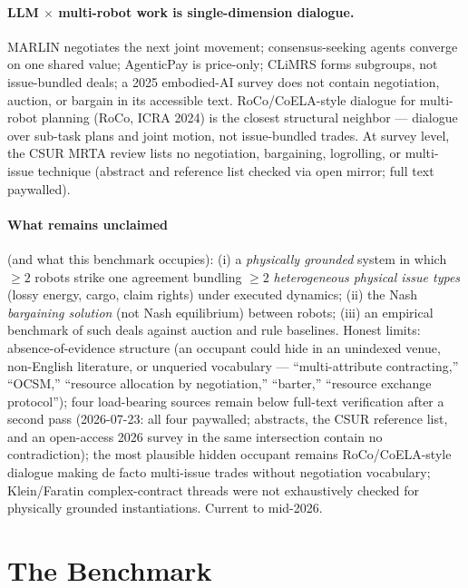 \documentclass[sigconf,nonacm]{acmart}
\begin{document}
\paragraph{LLM $\times$ multi-robot work is single-dimension dialogue.}
MARLIN \cite{godfrey2024marlin} negotiates the next joint movement;
consensus-seeking agents \cite{chen2023consensus} converge on one shared
value; AgenticPay \cite{liu2026agenticpay} is price-only; CLiMRS
\cite{song2026climrs} forms subgroups, not issue-bundled deals; a 2025
embodied-AI survey \cite{feng2025embodied} does not contain negotiation,
auction, or bargain in its accessible text. RoCo/CoELA-style dialogue for
multi-robot planning (RoCo, ICRA 2024) is the closest structural neighbor
--- dialogue over sub-task plans and joint motion, not issue-bundled
trades. At survey level, the CSUR MRTA review \cite{athira2024slr} lists no
negotiation, bargaining, logrolling, or multi-issue technique (abstract and
reference list checked via open mirror; full text paywalled).

\paragraph{What remains unclaimed} (and what this benchmark occupies): (i)
a \emph{physically grounded} system in which ${\geq}2$ robots strike one
agreement bundling ${\geq}2$ \emph{heterogeneous physical issue types}
(lossy energy, cargo, claim rights) under executed dynamics; (ii) the Nash
\emph{bargaining solution} \cite{nash1950bargaining} (not Nash equilibrium)
between robots; (iii) an empirical benchmark of such deals against auction
and rule baselines. Honest limits: absence-of-evidence structure (an
occupant could hide in an unindexed venue, non-English literature, or
unqueried vocabulary --- ``multi-attribute contracting,'' ``OCSM,''
``resource allocation by negotiation,'' ``barter,'' ``resource exchange
protocol''); four load-bearing sources
\cite{cui2013game,ke2012task,hamidoglu2025nash,athira2024slr} remain below
full-text verification after a second pass (2026-07-23: all four paywalled;
abstracts, the CSUR reference list, and an open-access 2026 survey in the
same intersection contain no contradiction); the most plausible hidden
occupant remains RoCo/CoELA-style dialogue making de facto multi-issue
trades without negotiation vocabulary; Klein/Faratin complex-contract
threads were not exhaustively checked for physically grounded
instantiations. Current to mid-2026.

\section{The Benchmark}\label{sec:benchmark}
\end{document}
